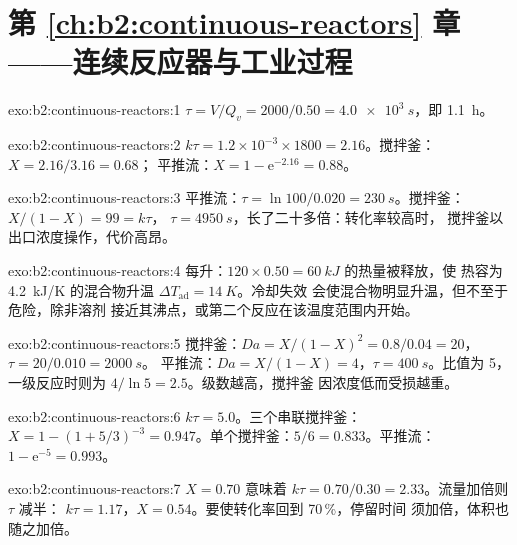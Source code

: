 \section*{第 \ref{ch:b2:continuous-reactors} 章——连续反应器与工业过程}

\begin{solution}{exo:b2:continuous-reactors:1}
$\tau = V/Q_v = 2000/0.50 = \qty{4.0e3}{s}$，即 \qty{1.1}{h}。
\end{solution}

\begin{solution}{exo:b2:continuous-reactors:2}
$k\tau = 1.2 \times 10^{-3} \times 1800 = 2.16$。搅拌釜：$X = 2.16/3.16 = 0.68$；
平推流：$X = 1 - \mathrm e^{-2.16} = 0.88$。
\end{solution}

\begin{solution}{exo:b2:continuous-reactors:3}
平推流：$\tau = \ln 100/0.020 = \qty{230}{s}$。搅拌釜：$X/(1 - X) = 99 = k\tau$，
$\tau = \qty{4950}{s}$，长了二十多倍：转化率较高时，
搅拌釜以出口浓度操作，代价高昂。
\end{solution}

\begin{solution}{exo:b2:continuous-reactors:4}
每升：$120 \times 0.50 = \qty{60}{kJ}$ 的热量被释放，使
热容为 \qty{4.2}{kJ/K} 的混合物升温 $\Delta T_{\text{ad}} = \qty{14}{K}$。冷却失效
会使混合物明显升温，但不至于危险，除非溶剂
接近其沸点，或第二个反应在该温度范围内开始。
\end{solution}

\begin{solution}{exo:b2:continuous-reactors:5}
搅拌釜：$Da = X/(1 - X)^2 = 0.8/0.04 = 20$，$\tau = 20/0.010 = \qty{2000}{s}$。
平推流：$Da = X/(1 - X) = 4$，$\tau = \qty{400}{s}$。比值为 5，一级反应时则为 $4/\ln 5 =
2.5$。级数越高，搅拌釜
因浓度低而受损越重。
\end{solution}

\begin{solution}{exo:b2:continuous-reactors:6}
$k\tau = 5.0$。三个串联搅拌釜：$X = 1 - (1 + 5/3)^{-3} = 0.947$。单个搅拌釜：$5/6 =
0.833$。平推流：$1 - \mathrm e^{-5} = 0.993$。
\end{solution}

\begin{solution}{exo:b2:continuous-reactors:7}
$X = 0.70$ 意味着 $k\tau = 0.70/0.30 = 2.33$。流量加倍则 $\tau$ 减半：
$k\tau = 1.17$，$X = 0.54$。要使转化率回到 70\,\%，停留时间
须加倍，体积也随之加倍。
\end{solution}

